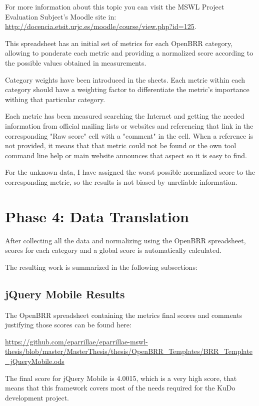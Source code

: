 \documentclass[a4paper,12pt]{book}
\begin{document}
For more information about this topic you can visit the MSWL Project Evaluation Subject's Moodle site in:\\
\url{http://docencia.etsit.urjc.es/moodle/course/view.php?id=125}. 

This spreadsheet has an initial set of metrics for each OpenBRR category, allowing to ponderate each metric and providing a normalized score according to the possible values obtained in measurements.

Category weights have been introduced in the sheets. Each metric within each category should have a weighting factor to differentiate the metric's importance withing that particular category. 

Each metric has been measured searching the Internet and getting the needed information from official mailing lists or websites and referencing that link in the corresponding "Raw score" cell with a "comment" in the cell. When a reference is not provided, it means that that metric could not be found or the own tool command line help or main website announces that aspect so it is easy to find.

For the unknown data, I have assigned the worst possible normalized score to the corresponding metric, so the results is not biased by unreliable information.

\section{Phase 4: Data Translation}
\label{sec:phase4}

After collecting all the data and normalizing using the OpenBRR spreadsheet, scores for each category and a global score is automatically calculated.

The resulting work is summarized in the following subsections:

\subsection{jQuery Mobile Results}
\label{jQuery Mobile Results}

The OpenBRR spreadsheet containing the metrics final scores and comments justifying those scores can be found here:

\url{
https://github.com/eparrillae/eparrillae-mswl-thesis/blob/master/MasterThesis/thesis/OpenBRR_Templates/BRR_Template_jQueryMobile.ods}

The final score for jQuery Mobile is 4.0015, which is a very high score, that means that this framework covers most of the needs required for the KuDo development project.
\end{document}
